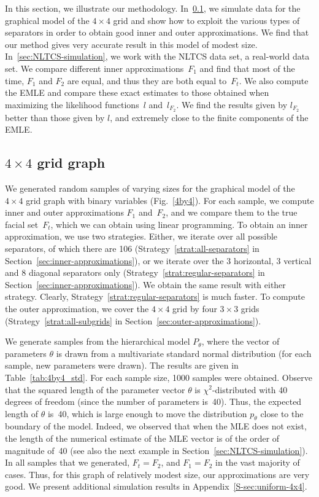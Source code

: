 \documentclass[aos,noinfoline]{imsart}
\theoremstyle{remark}
\theoremstyle{definition}
\begin{document}
In this section, we illustrate our methodology.  In~\ref{sec:4x4}, we simulate data for the graphical model of the
$4\times4$ grid and show how to exploit the various types of separators in order to obtain good inner and outer
approximations.  We find that our method gives very accurate result in this model of modest size.
%
In~\ref{sec:NLTCS-simulation}, we work with the NLTCS data set, a real-world data set.
We compare different inner approximations~$F_{1}$ and find that most of the time, $F_{1}$ and $F_{2}$ are equal, and
thus they are both equal to~$F_{t}$.  We also compute the EMLE and compare these exact estimates to those obtained  when maximizing
the likelihood functions~$l$ and~$l_{F_{2}}$. We find the results given by $l_{F_{2}}$ better than those given by $l$, and extremely close to the finite components of the EMLE.

\subsection{\texorpdfstring{$4 \times 4$}{4x4} grid graph}
\label{sec:4x4}

We generated random samples of varying sizes for the graphical model of the $4\times4$ grid graph with binary variables (Fig.~\ref{4by4}).
For each sample, we compute inner and outer approximations $F_{1}$ and~$F_{2}$, and we compare them to the true facial
set~$F_{t}$, which we can obtain using linear programming.
To obtain an inner approximation, we use two strategies. Either, we iterate over all possible separators, of which there
are 106 (Strategy~\eqref{strat:all-separators} in Section~\ref{sec:inner-approximations}), or we iterate over the 3
horizontal, 3 vertical and 8 diagonal separators only (Strategy~\eqref{strat:regular-separators} in
Section~\ref{sec:inner-approximations}).  We obtain the same result with either strategy.  Clearly,
Strategy~\eqref{strat:regular-separators} is much faster.  To compute the outer approximation, we cover the $4\times4$
grid by four $3\times3$ grids (Strategy~\eqref{strat:all-subgrids} in Section~\ref{sec:outer-approximations}).

We generate samples from the hierarchical model $P_{\theta}$, where the vector of parameters
$\theta$ is drawn from a multivariate standard normal distribution (for each sample, new parameters were drawn).  The
results are given in Table~\ref{tab:4by4_std}.  For each sample size, \num{1000} samples were obtained.   Observe that the squared length
of the parameter vector $\theta$ is $\chi^2$-distributed with 40 degrees of freedom (since the number of parameters
is~40).  Thus, the expected length of $\theta$ is~40, which is large enough to move the distribution $p_{\theta}$ close
to the boundary of the model.  Indeed, we observed that when the MLE does not exist, the length of the numerical
estimate of the MLE vector is of the order of magnitude of~40 (see also the next example in
Section~\ref{sec:NLTCS-simulation}).
In all samples that we generated, $F_{t}=F_{2}$, and $F_{1}=F_{2}$ in the vast majority of cases.  Thus, for
this graph of relatively modest size, our approximations are very good.
%
We present additional simulation results in Appendix~\ref{S-sec:uniform-4x4}.
\end{document}
